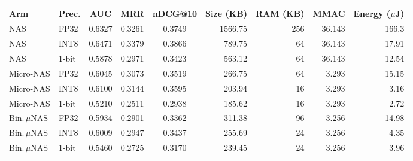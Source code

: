 \begin{tabular}{llcccrrrr}
\toprule
Arm & Prec. & AUC & MRR & nDCG@10 & Size (KB) & RAM (KB) & MMAC & Energy ($\mu$J)\\
\midrule
NAS & FP32 & 0.6327 & 0.3261 & 0.3749 & 1566.75 & 256 & 36.143 & 166.3\\
NAS & INT8 & 0.6471 & 0.3379 & 0.3866 & 789.75 & 64 & 36.143 & 17.91\\
NAS & 1-bit & 0.5878 & 0.2971 & 0.3423 & 563.12 & 64 & 36.143 & 12.54\\
\midrule
Micro-NAS & FP32 & 0.6045 & 0.3073 & 0.3519 & 266.75 & 64 & 3.293 & 15.15\\
Micro-NAS & INT8 & 0.6100 & 0.3144 & 0.3595 & 203.94 & 16 & 3.293 & 3.16\\
Micro-NAS & 1-bit & 0.5210 & 0.2511 & 0.2938 & 185.62 & 16 & 3.293 & 2.72\\
\midrule
Bin.\,$\mu$NAS & FP32 & 0.5934 & 0.2901 & 0.3362 & 311.38 & 96 & 3.256 & 14.98\\
Bin.\,$\mu$NAS & INT8 & 0.6009 & 0.2947 & 0.3437 & 255.69 & 24 & 3.256 & 4.35\\
Bin.\,$\mu$NAS & 1-bit & 0.5460 & 0.2725 & 0.3170 & 239.45 & 24 & 3.256 & 3.96\\
\bottomrule
\end{tabular}
